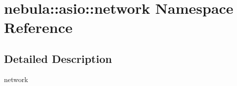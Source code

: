 \hypertarget{namespacenebula_1_1asio_1_1network}{
\section{nebula::asio::network Namespace Reference}
\label{namespacenebula_1_1asio_1_1network}
}


\subsection{Detailed Description}
network 